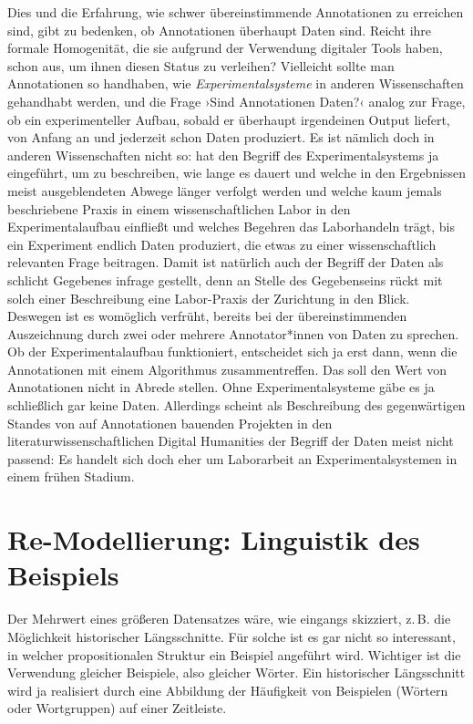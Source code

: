 \documentclass{article}
\begin{document}
Dies und die Erfahrung, wie schwer übereinstimmende Annotationen zu
erreichen sind, gibt zu bedenken, ob Annotationen überhaupt Daten
sind. Reicht ihre formale Homogenität, die sie aufgrund der Verwendung
digitaler Tools haben, schon aus, um ihnen diesen Status zu
verleihen? %
Vielleicht sollte man Annotationen so handhaben, wie
\emph{Experimentalsysteme} in anderen Wissenschaften gehandhabt
werden, und die Frage ›Sind Annotationen Daten?‹ analog zur Frage, ob
ein experimenteller Aufbau, sobald er überhaupt irgendeinen Output
liefert, von Anfang an und jederzeit schon Daten produziert. Es ist
nämlich doch in anderen Wissenschaften nicht so:
\textcite{Rheinberger2001a} hat den Begriff des Experimentalsystems ja
eingeführt, um zu beschreiben, wie lange es dauert und welche in den
Ergebnissen meist ausgeblendeten Abwege länger verfolgt werden
und welche kaum jemals beschriebene Praxis in einem wissenschaftlichen
Labor in den Experimentalaufbau einfließt und welches Begehren das
Laborhandeln trägt, bis ein Experiment endlich Daten produziert, die
etwas zu einer wissenschaftlich relevanten Frage beitragen. Damit ist
natürlich auch der Begriff der Daten als schlicht Gegebenes infrage
gestellt, denn an Stelle des Gegebenseins rückt mit solch einer
Beschreibung eine Labor-Praxis der Zurichtung in den Blick. Deswegen
ist es womöglich verfrüht, bereits bei der übereinstimmenden
Auszeichnung durch zwei oder mehrere Annotator*innen von Daten zu
sprechen. Ob der Experimentalaufbau funktioniert, entscheidet sich ja
erst dann, wenn die Annotationen mit einem Algorithmus
zusammentreffen. Das soll den Wert von Annotationen nicht in Abrede
stellen. Ohne Experimentalsysteme gäbe es ja schließlich gar keine
Daten. Allerdings scheint als Beschreibung des gegenwärtigen Standes
von auf Annotationen bauenden Projekten in den
literaturwissenschaftlichen Digital Humanities der Begriff der Daten
meist nicht passend: Es handelt sich doch eher um Laborarbeit an
Experimentalsystemen in einem frühen Stadium.

\section{Re-Modellierung: Linguistik des Beispiels}

Der Mehrwert eines größeren Datensatzes wäre, wie eingangs skizziert,
z.\,B. die Möglichkeit historischer Längsschnitte. Für solche ist es
gar nicht so interessant, in welcher propositionalen Struktur ein
Beispiel angeführt wird. Wichtiger ist die Verwendung gleicher
Beispiele, also gleicher Wörter. Ein historischer Längsschnitt wird ja
realisiert durch eine Abbildung der Häufigkeit von Beispielen (Wörtern
oder Wortgruppen) auf einer Zeitleiste.
\end{document}
